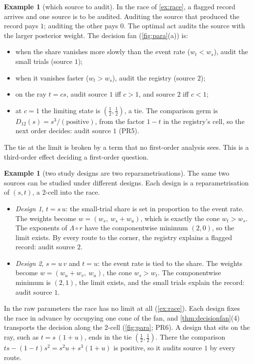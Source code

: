\documentclass[11pt]{article}
\theoremstyle{definition}\newtheorem{definition}[theorem]{Definition}\newtheorem{remark}[theorem]{Remark}\newtheorem{example}[theorem]{Example}
\begin{document}
\begin{example}[which source to audit]\label{ex:audit}
In the race of \cref{ex:race}, a flagged record arrives and one source is to be audited. Auditing the source that produced the record pays $1$;
auditing the other pays $0$. The optimal act audits the source with the larger posterior weight. The decision fan
(\cref{fig:para}(a)) is:
\begin{itemize}
\item when the share vanishes more slowly than the event rate ($w_t<w_s$), audit the small trials (source $1$);
\item when it vanishes faster ($w_t>w_s$), audit the registry (source $2$);
\item on the ray $t=cs$, audit source $1$ iff $c>1$, and source $2$ iff $c<1$;
\item at $c=1$ the limiting state is $(\tfrac12,\tfrac12)$, a tie. The comparison germ is $D_{12}(s)=s^3/(\text{positive})$, from the factor $1-t$ in the
  registry's cell, so the next order decides: audit source $1$ (PR5).
\end{itemize}
The tie at the limit is broken by a term that no first-order analysis sees. This is a third-order effect deciding a first-order question.
\end{example}

\begin{example}[two study designs are two reparametrisations]\label{ex:designs}
The same two sources can be studied under different designs. Each design is a reparametrisation of $(s,t)$, a 2-cell into the race.
\begin{itemize}
\item \emph{Design 1}, $t=s\,u$: the small-trial share is set in proportion to the event rate. The weights become $w=(w_s,\ w_s+w_u)$, which is exactly the
  cone $w_t>w_s$. The exponents of $\Lambda\circ r$ have the componentwise minimum $(2,0)$, so the limit exists. By every route to the corner,
  the registry explains a flagged record: audit source $2$.
\item \emph{Design 2}, $s=u\,v$ and $t=u$: the event rate is tied to the share. The weights become $w=(w_u+w_v,\ w_u)$, the cone $w_s>w_t$. The
  componentwise minimum is $(2,1)$, the limit exists, and the small trials explain the record: audit source $1$.
\end{itemize}
In the raw parameters the race has no limit at all (\cref{ex:race}). Each design fixes the race in advance by occupying one cone of the
fan, and \cref{thm:decisionfan}(4) transports the decision along the 2-cell (\cref{fig:para}; PR6). A design that sits on the ray, such as $t=s\,(1+u)$,
ends in the tie $(\tfrac12,\tfrac12)$. There the comparison $ts-(1-t)s^2=s^2u+s^3(1+u)$ is positive, so it audits source $1$ by every route.
\end{example}
\end{document}
